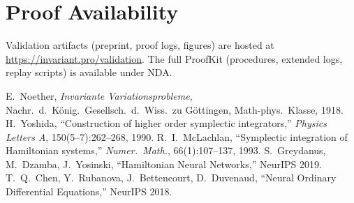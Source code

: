 \documentclass[10pt]{article}
\begin{document}
\section*{Proof Availability}
Validation artifacts (preprint, proof logs, figures) are hosted at \url{https://invariant.pro/validation}. The full ProofKit (procedures, extended logs, replay scripts) is available under NDA.

\begin{thebibliography}{9}
 E.\ Noether, \emph{Invariante Variationsprobleme}, Nachr.\ d.\ König.\ Gesellsch.\ d.\ Wiss.\ zu Göttingen, Math-phys.\ Klasse, 1918.
 H.\ Yoshida, ``Construction of higher order symplectic integrators,'' \emph{Physics Letters A}, 150(5--7):262--268, 1990.
 R.\ I.\ McLachlan, ``Symplectic integration of Hamiltonian systems,'' \emph{Numer.\ Math.}, 66(1):107--137, 1993.
 S.\ Greydanus, M.\ Dzamba, J.\ Yosinski, ``Hamiltonian Neural Networks,'' NeurIPS 2019.
 T.\ Q.\ Chen, Y.\ Rubanova, J.\ Bettencourt, D.\ Duvenaud, ``Neural Ordinary Differential Equations,'' NeurIPS 2018.
\end{thebibliography}
\end{document}
